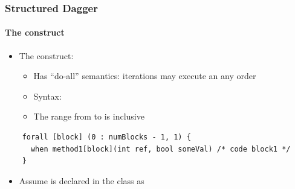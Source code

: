 \begin{frame}[fragile]
  \frametitle{Structured Dagger}
  \framesubtitle{The  construct}
  \begin{itemize}
  \item The  construct:
    \begin{itemize}
    \item Has ``do-all'' semantics: iterations may execute an any order
    \item Syntax: 
    \item The range from  to  is inclusive
    \end{itemize}
  \end{itemize}
  \begin{lstlisting}
    forall [block] (0 : numBlocks - 1, 1) {
      when method1[block](int ref, bool someVal) /* code block1 */
    }
  \end{lstlisting}
  \begin{itemize}
    \item Assume  is declared in the class as 
  \end{itemize}
\end{frame}

\removeForTutorial{

}

%   
% 
%   

%   

%   

%   

